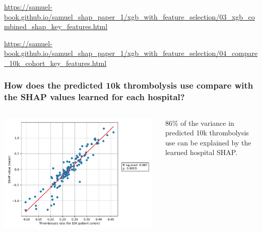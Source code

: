 \documentclass[xcolor={usenames,dvipsnames}]{beamer}
\newcommand{\smallurl}[1]{\textcolor{blue}{\fontsize{4pt}{4.8pt}\selectfont \url{#1}}}
\begin{document}
\begin{frame}
\begin{columns}
\end{columns} 



\smallurl{https://samuel-book.github.io/samuel_shap_paper_1/xgb_with_feature_selection/03_xgb_combined_shap_key_features.html}

\smallurl{https://samuel-book.github.io/samuel_shap_paper_1/xgb_with_feature_selection/04_compare_10k_cohort_key_features.html}


\end{frame}



\begin{frame}
\frametitle{How does the predicted 10k thrombolysis use compare with the SHAP values learned for each hospital?}

\begin{columns}
    \begin{center} 
    \includegraphics[width=0.98\textwidth]{./images/rsquared_shap_predicted_thrombolysis}
    \end{center} 
    
    
    {\footnotesize
    86\% of the variance in predicted
    10k thrombolysis use can be
    explained by the learned hospital
    SHAP.}
\end{columns}


\end{frame}


\end{document}
